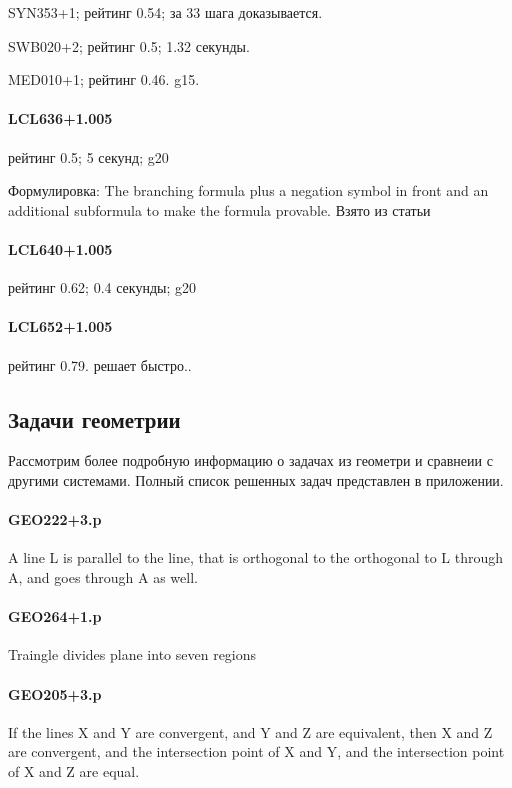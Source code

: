 SYN353+1; рейтинг 0.54; за 33 шага доказывается.

SWB020+2; рейтинг 0.5; 1.32 секунды. 

MED010+1; рейтинг 0.46. g15.

\paragraph{LCL636+1.005}
рейтинг 0.5; 5 секунд; g20

Формулировка: The branching formula plus a negation symbol in front and an additional subformula to make the formula provable.
Взято из статьи \cite{SourceLCL}

\paragraph{LCL640+1.005}
рейтинг 0.62; 0.4 секунды; g20


\paragraph{LCL652+1.005}
рейтинг 0.79. решает быстро..

\subsection{Задачи геометрии}
Рассмотрим более подробную информацию о задачах из геометри и сравнеии с другими системами. Полный список решенных задач представлен в приложении.

\paragraph{GEO222+3.p}
A line L is parallel to the line, that is orthogonal to the orthogonal to L through A, and goes through A as well.

\paragraph{GEO264+1.p}
Traingle divides plane into seven regions

\paragraph{GEO205+3.p}
If the lines X and Y are convergent, and Y and Z are  equivalent, then X and Z are convergent, and the intersection   point of X and Y, and the intersection point of X and Z are equal.

